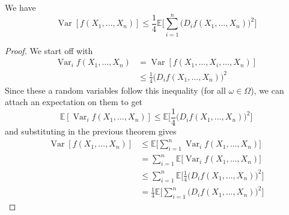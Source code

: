 \documentclass{article}
\DeclareMathOperator{\Var}{Var}
\begin{document}
  \begin{corollary}
  We have 
  \[\Var[ f(X_1, \ldots, X_n)] \leq \frac{1}{4} \mathbb{E} \bigg[ \sum_{i=1}^n \big( D_i f(X_1, \ldots, X_n) \big)^2 \bigg] \]
  \end{corollary}
  \begin{proof}
  We start off with 
  \begin{align*}
      \Var_i f (X_1, \ldots, X_n) & = \Var[ f(X_1, \ldots, X_i, \ldots, X_n)] \\
      & \leq \frac{1}{4} \big( D_i f (X_1, \ldots, X_n)\big)^2 
  \end{align*}
  Since these a random variables follow this inequality (for all $\omega \in \Omega$), we can attach an expectation on them to get 
  \[\mathbb{E}[\Var_i f (X_1, \ldots, X_n)] \leq \mathbb{E} \bigg[ \frac{1}{4} \big( D_i f (X_1, \ldots, X_n)\big)^2\bigg] \]
  and substituting in the previous theorem gives 
  \begin{align*}
      \Var[f(X_1, \ldots, X_n)] & \leq \mathbb{E} \bigg[ \sum_{i=1}^n \Var_i f(X_1, \ldots, X_n) \bigg] \\
      & = \sum_{i=1}^n \mathbb{E}\big[ \Var_i f(X_1, \ldots, X_n) \big] \\
      & \leq \sum_{i=1}^n \mathbb{E} \bigg[ \frac{1}{4} \big( D_i f (X_1, \ldots, X_n)\big)^2\bigg] \\
      & = \frac{1}{4} \mathbb{E} \bigg[ \sum_{i=1}^n \big( D_i f(X_1, \ldots, X_n) \big)^2 \bigg] 
  \end{align*}
  \end{proof}

  \begin{example}

  \end{example}
\end{document}

